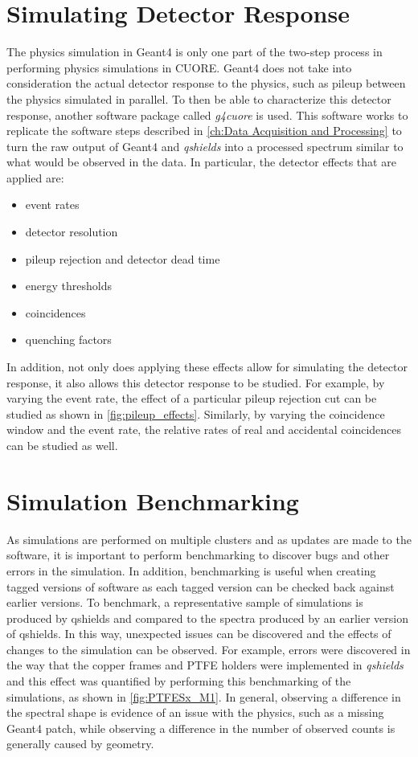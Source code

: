 \section{Simulating Detector Response}
The physics simulation in Geant4 is only one part of the two-step process in performing physics simulations in CUORE.
Geant4 does not take into consideration the actual detector response to the physics, such as pileup between the physics simulated in parallel.
To then be able to characterize this detector response, another software package called \textit{g4cuore} is used.
This software works to replicate the software steps described in \autoref{ch:Data Acquisition and Processing} to turn the raw output of Geant4 and \textit{qshields} into a processed spectrum similar to what would be observed in the data.
In particular, the detector effects that are applied are:
\begin{itemize}
    \item event rates
    \item detector resolution
    \item pileup rejection and detector dead time
    \item energy thresholds
    \item coincidences 
    \item quenching factors
\end{itemize}
In addition, not only does applying these effects allow for simulating the detector response, it also allows this detector response to be studied.
For example, by varying the event rate, the effect of a particular pileup rejection cut can be studied as shown in \autoref{fig:pileup_effects}.
Similarly, by varying the coincidence window and the event rate, the relative rates of real and accidental coincidences can be studied as well.


\section{Simulation Benchmarking}

As simulations are performed on multiple clusters and as updates are made to the software, it is important to perform benchmarking to discover bugs and other errors in the simulation.
In addition, benchmarking is useful when creating tagged versions of software as each tagged version can be checked back against earlier versions.
To benchmark, a representative sample of simulations is produced by qshields and compared to the spectra produced by an earlier version of qshields.
In this way, unexpected issues can be discovered and the effects of changes to the simulation can be observed.
For example, errors were discovered in the way that the copper frames and PTFE holders were implemented in \textit{qshields} and this effect was quantified by performing this benchmarking of the simulations, as shown in \autoref{fig:PTFESx_M1}.
In general, observing a difference in the spectral shape is evidence of an issue with the physics, such as a missing Geant4 patch, while observing a difference in the number of observed counts is generally caused by geometry.

